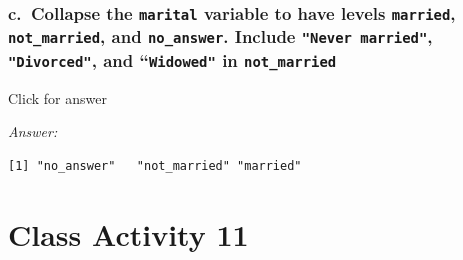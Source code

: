 \documentclass[
]{book}
\newenvironment{Shaded}{\begin{snugshade}}{\end{snugshade}}
\newcommand{\AttributeTok}[1]{\textcolor[rgb]{0.13,0.29,0.53}{#1}}
\newcommand{\CommentTok}[1]{\textcolor[rgb]{0.56,0.35,0.01}{\textit{#1}}}
\newcommand{\FunctionTok}[1]{\textcolor[rgb]{0.13,0.29,0.53}{\textbf{#1}}}
\newcommand{\NormalTok}[1]{#1}
\newcommand{\OtherTok}[1]{\textcolor[rgb]{0.56,0.35,0.01}{#1}}
\newcommand{\SpecialCharTok}[1]{\textcolor[rgb]{0.81,0.36,0.00}{\textbf{#1}}}
\newcommand{\StringTok}[1]{\textcolor[rgb]{0.31,0.60,0.02}{#1}}
\begin{document}
\hypertarget{c.-collapse-the-marital-variable-to-have-levels-married-not_married-and-no_answer.-include-never-married-divorced-and-widowed-in-not_married}{%
\subsection{\texorpdfstring{c.~Collapse the \texttt{marital} variable to have levels \texttt{married}, \texttt{not\_married}, and \texttt{no\_answer}. Include \texttt{"Never\ married"}, \texttt{"Divorced"}, and ``\texttt{Widowed"} in \texttt{not\_married}}{c.~Collapse the marital variable to have levels married, not\_married, and no\_answer. Include "Never married", "Divorced", and ``Widowed" in not\_married}}\label{c.-collapse-the-marital-variable-to-have-levels-married-not_married-and-no_answer.-include-never-married-divorced-and-widowed-in-not_married}}

Click for answer

\emph{Answer:}

\begin{Shaded}
\end{Shaded}

\begin{verbatim}
[1] "no_answer"   "not_married" "married"    
\end{verbatim}

\hypertarget{class-activity-11}{%
\chapter{Class Activity 11}\label{class-activity-11}}
\end{document}
